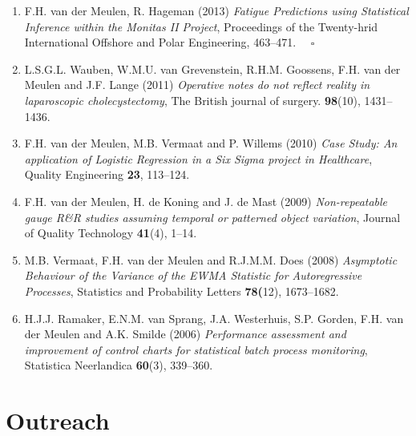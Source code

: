 \documentclass[
10pt, %
a4paper, %
oneside, %
headinclude,footinclude, %
BCOR5mm, %
]{scrartcl}
\begin{document}
\begin{enumerate}
\item {\sc F.H. van der Meulen, R. Hageman (2013)} {\it  Fatigue Predictions using Statistical Inference within the Monitas II Project}, Proceedings of the Twenty-hrid International Offshore and Polar Engineering, 463--471.\hspace*{\fill}  $\quad \square$

\item {\sc L.S.G.L. Wauben, W.M.U. van Grevenstein, R.H.M. Goossens, F.H. van der Meulen and J.F. Lange (2011)} {\it  Operative notes do not reflect reality in laparoscopic cholecystectomy}, The British journal of surgery. {\bf 98}(10), 1431--1436.

\item {\sc F.H. van der Meulen, M.B. Vermaat and P. Willems (2010)} {\it  Case Study: An application of Logistic Regression in a Six Sigma project in Healthcare}, Quality Engineering {\bf 23}, 113--124.

\item {\sc F.H. van der Meulen, H. de Koning and J. de Mast (2009)} {\it   Non-repeatable gauge R\&R studies assuming temporal or patterned object variation}, Journal of Quality Technology {\bf 41}(4), 1--14.

\item {\sc M.B. Vermaat, F.H. van der Meulen and R.J.M.M. Does (2008)} {\it  Asymptotic Behaviour of the Variance of the EWMA Statistic for Autoregressive Processes}, Statistics and Probability Letters {\bf 78(}12), 1673--1682.

\item {\sc H.J.J. Ramaker, E.N.M. van Sprang, J.A. Westerhuis, S.P. Gorden, F.H. van der Meulen and A.K. Smilde (2006)} {\it  Performance assessment and improvement of control charts for statistical batch process monitoring},  Statistica Neerlandica {\bf 60}(3), 339--360.

\end{enumerate}


\section{Outreach}
\end{document}
